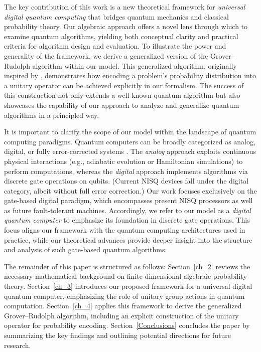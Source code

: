 \documentclass[a4paper,11pt]{article}
\begin{document}
The key contribution of this work is a new theoretical framework for \emph{universal digital quantum computing} that bridges quantum mechanics and classical probability theory. Our algebraic approach offers a novel lens through which to examine quantum algorithms, yielding both conceptual clarity and practical criteria for algorithm design and evaluation. To illustrate the power and generality of the framework, we derive a generalized version of the Grover–Rudolph algorithm within our model. This generalized algorithm, originally inspired by \cite{GroverRudolph}, demonstrates how encoding a problem’s probability distribution into a unitary operator can be achieved explicitly in our formalism. The success of this construction not only extends a well-known quantum algorithm but also showcases the capability of our approach to analyze and generalize quantum algorithms in a principled way.

It is important to clarify the scope of our model within the landscape of quantum computing paradigms. Quantum computers can be broadly categorized as analog, digital, or fully error-corrected systems \cite{2019NAC}. The \textit{analog} approach exploits continuous physical interactions (e.g., adiabatic evolution or Hamiltonian simulations) to perform computations, whereas the \textit{digital} approach implements algorithms via discrete gate operations on qubits. (Current NISQ devices fall under the digital category, albeit without full error correction.) Our work focuses exclusively on the gate-based digital paradigm, which encompasses present NISQ processors as well as future fault-tolerant machines. Accordingly, we refer to our model as a \textit{digital quantum computer} to emphasize its foundation in discrete gate operations. This focus aligns our framework with the quantum computing architectures used in practice, while our theoretical advances provide deeper insight into the structure and analysis of such gate-based quantum algorithms.

The remainder of this paper is structured as follows: Section~\ref{ch_2} reviews the necessary mathematical background on finite-dimensional algebraic probability theory. Section~\ref{ch_3} introduces our proposed framework for a universal digital quantum computer, emphasizing the role of unitary group actions in quantum computation. Section~\ref{ch_4} applies this framework to derive the generalized Grover–Rudolph algorithm, including an explicit construction of the unitary operator for probability encoding. Section~\ref{Conclusions} concludes the paper by summarizing the key findings and outlining potential directions for future research.
\end{document}

